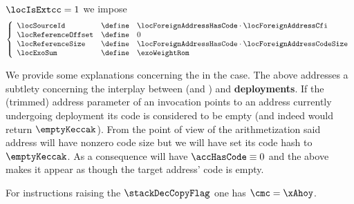 \begin{description}
\begin{description}
\begin{description}
						\If $\locIsExtcc = 1$ \Then
						we impose
						\[
							\left\{ \begin{array}{lcl}
								\locSourceId        & \define & \locForeignAddressHasCode \cdot \locForeignAddressCfi      \\
								\locReferenceOffset & \define & 0                                                          \\
								\locReferenceSize   & \define & \locForeignAddressHasCode \cdot \locForeignAddressCodeSize \\
								\locExoSum          & \define & \exoWeightRom                                              \\
							\end{array} \right.
						\]
				\end{description}
			\end{description}
		\end{description}
		\saNote{}
		\label{hub: instruction handling: copy: extcodecopy: subtlety around existence and liveness of foreign account}
		We provide some explanations concerning the \locReferenceSize{} in the  case.
		The above addresses a subtlety concerning the interplay between  (and ) and \textbf{deployments}.
		If the (trimmed) address parameter of an  invocation points to an address currently undergoing deployment its code is considered to be empty (and indeed  would return $\emptyKeccak$).
		From the point of view of the arithmetization said address will have nonzero code size but we will have set its code hash to $\emptyKeccak$.
		As a consequence will have $\accHasCode \equiv 0$ and the above makes it appear as though the target address' code is empty.

		\saNote{} For instructions raising the $\stackDecCopyFlag$ one has $\cmc = \xAhoy$.

